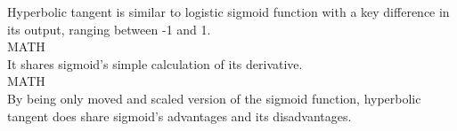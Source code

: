 
Hyperbolic tangent is similar to logistic sigmoid function with a key difference in its output, ranging between -1 and 1. \\

MATH\\

It shares sigmoid's simple calculation of its derivative.\\

MATH\\

By being only moved and scaled version of the sigmoid function, hyperbolic tangent does share sigmoid's advantages and its disadvantages.\cite{leskovec2020mining}
